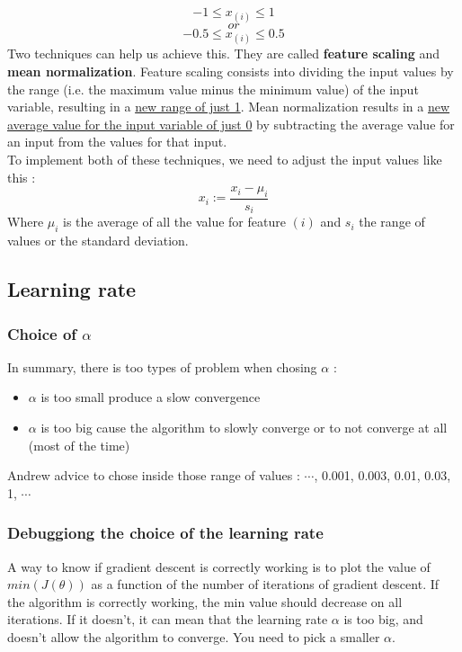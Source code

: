 \documentclass{article}
\begin{document}
$$-1 \leq x_{(i)} \leq 1$$
$$or$$
$$-0.5 \leq x_{(i)} \leq 0.5$$
Two techniques can help us achieve this. They are called \textbf{feature scaling} and \textbf{mean normalization}. Feature scaling consists into dividing the input values by the range (i.e. the maximum value minus the minimum value) of the input variable, resulting in a \underline{new range of just 1}. Mean normalization results in a \underline{new average value for the input variable of just 0} by subtracting the average value for an input from the values for that input. \\
To implement both of these techniques, we need to adjust the input values like this :
$$x_{i} := \frac{x_{i} - \mu_{i}}{s_{i}}$$
Where $\mu_{i}$ is the average of all the value for feature $(i)$ and $s_{i}$ the range of values or the standard deviation.

\subsection{Learning rate}
\subsubsection{Choice of $\alpha$}
In summary, there is too types of problem when chosing $\alpha$ :
\begin{itemize}
	\item $\alpha$ is too small produce a slow convergence
	\item $\alpha$ is too big cause the algorithm to slowly converge or to not converge at all (most of the time) 
\end{itemize}
Andrew advice to chose inside those range of values : $\cdots$, 0.001, 0.003, 0.01, 0.03, 1, $\cdots$

\subsubsection{Debuggiong the choice of the learning rate}
A way to know if gradient descent is correctly working is to plot the value of $min(J(\theta))$ as a function of the number of iterations of gradient descent. If the algorithm is correctly working, the min value should decrease on all iterations. If it doesn't, it can mean that the learning rate $\alpha$ is too big, and doesn't allow the algorithm to converge. You need to pick a smaller $\alpha$.
\end{document}
